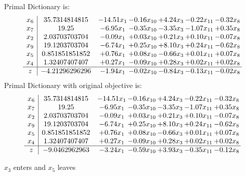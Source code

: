 \documentclass[8pt]{article}
\begin{document}
Primal Dictionary is:
\[\begin{array}{c| c c@{\hskip 2pt} c@{\hskip 2pt} c@{\hskip 2pt} c@{\hskip 2pt} c@{\hskip 2pt} }
 x_{6}   &  35.7314814815 & -14.51 x_{1} & -0.16 x_{10} & +  4.24 x_{3} & -0.22 x_{11} & -0.32 x_{8}\\
 x_{7}   &  19.25 & -6.95 x_{1} & -0.35 x_{10} & -3.35 x_{3} & -1.07 x_{11} & +  0.35 x_{8}\\
 x_{2}   &  2.03703703704 & -0.09 x_{1} & +  0.03 x_{10} & +  0.21 x_{3} & +  0.10 x_{11} & -0.07 x_{8}\\
 x_{9}   &  19.1203703704 & -6.74 x_{1} & +  0.25 x_{10} & +  8.10 x_{3} & +  0.24 x_{11} & -0.62 x_{8}\\
 x_{5}   &  0.851851851852 & +  0.76 x_{1} & +  0.08 x_{10} & -0.66 x_{3} & +  0.01 x_{11} & +  0.07 x_{8}\\
 x_{4}   &  1.32407407407 & +  0.27 x_{1} & -0.09 x_{10} & +  0.28 x_{3} & +  0.02 x_{11} & +  0.02 x_{8}\\
\hline
z    &  -4.21296296296 & -1.94 x_{1} & -0.02 x_{10} & -0.84 x_{3} & -0.13 x_{11} & -0.02 x_{8}\\
\end{array}\]
Primal Dictionary with original objective is:
\[\begin{array}{c| c c@{\hskip 2pt} c@{\hskip 2pt} c@{\hskip 2pt} c@{\hskip 2pt} c@{\hskip 2pt} }
 x_{6}   &  35.7314814815 & -14.51 x_{1} & -0.16 x_{10} & +  4.24 x_{3} & -0.22 x_{11} & -0.32 x_{8}\\
 x_{7}   &  19.25 & -6.95 x_{1} & -0.35 x_{10} & -3.35 x_{3} & -1.07 x_{11} & +  0.35 x_{8}\\
 x_{2}   &  2.03703703704 & -0.09 x_{1} & +  0.03 x_{10} & +  0.21 x_{3} & +  0.10 x_{11} & -0.07 x_{8}\\
 x_{9}   &  19.1203703704 & -6.74 x_{1} & +  0.25 x_{10} & +  8.10 x_{3} & +  0.24 x_{11} & -0.62 x_{8}\\
 x_{5}   &  0.851851851852 & +  0.76 x_{1} & +  0.08 x_{10} & -0.66 x_{3} & +  0.01 x_{11} & +  0.07 x_{8}\\
 x_{4}   &  1.32407407407 & +  0.27 x_{1} & -0.09 x_{10} & +  0.28 x_{3} & +  0.02 x_{11} & +  0.02 x_{8}\\
\hline
z    &  -9.0462962963 & -3.24 x_{1} & -0.59 x_{10} & +  3.93 x_{3} & -0.35 x_{11} & -0.12 x_{8}\\
\end{array}\]


 $ x_{3} $ enters and $ x_{5} $ leaves 
\end{document}
